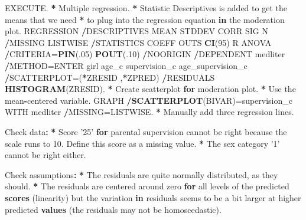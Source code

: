 \documentclass[a4paper]{book}
\newenvironment{Shaded}{\begin{snugshade}}{\end{snugshade}}
\newcommand{\KeywordTok}[1]{\textcolor[rgb]{0,0,0}{\textbf{#1}}}
\newcommand{\DecValTok}[1]{\textcolor[rgb]{0.00,0.00,0.00}{#1}}
\newcommand{\StringTok}[1]{\textcolor[rgb]{0.00,0.00,0.00}{#1}}
\newcommand{\ControlFlowTok}[1]{\textcolor[rgb]{0.00,0.00,0.00}{\textbf{#1}}}
\newcommand{\OperatorTok}[1]{\textcolor[rgb]{0.00,0.00,0.00}{\textbf{#1}}}
\newcommand{\ErrorTok}[1]{\textcolor[rgb]{0.00,0.00,0.00}{\textbf{#1}}}
\newcommand{\NormalTok}[1]{#1}
\theoremstyle{definition}
\theoremstyle{definition}
\theoremstyle{definition}
\theoremstyle{remark}
\begin{document}
\begin{Shaded}
\begin{Highlighting}[]
\NormalTok{EXECUTE.  }
\OperatorTok{*}\StringTok{ }\NormalTok{Multiple regression.  }
\OperatorTok{*}\StringTok{ }\NormalTok{Statistic Descriptives is added to get the means that we need  }
\OperatorTok{*}\StringTok{ }\NormalTok{to plug into the regression equation }\ControlFlowTok{in}\NormalTok{ the moderation plot.  }
\NormalTok{REGRESSION  }
  \OperatorTok{/}\NormalTok{DESCRIPTIVES MEAN STDDEV CORR SIG N  }
  \OperatorTok{/}\NormalTok{MISSING LISTWISE  }
  \OperatorTok{/}\NormalTok{STATISTICS COEFF OUTS }\KeywordTok{CI}\NormalTok{(}\DecValTok{95}\NormalTok{) R ANOVA  }
  \OperatorTok{/}\NormalTok{CRITERIA=}\KeywordTok{PIN}\NormalTok{(.}\DecValTok{05}\NormalTok{) }\KeywordTok{POUT}\NormalTok{(.}\DecValTok{10}\NormalTok{)  }
  \OperatorTok{/}\NormalTok{NOORIGIN   }
  \OperatorTok{/}\NormalTok{DEPENDENT medliter  }
  \OperatorTok{/}\NormalTok{METHOD=ENTER girl age_c supervision_c age_supervision_c  }
  \OperatorTok{/}\NormalTok{SCATTERPLOT=(}\OperatorTok{*}\NormalTok{ZRESID ,}\OperatorTok{*}\NormalTok{ZPRED)  }
  \OperatorTok{/}\NormalTok{RESIDUALS }\KeywordTok{HISTOGRAM}\NormalTok{(ZRESID).  }
\OperatorTok{*}\StringTok{ }\NormalTok{Create scatterplot }\ControlFlowTok{for}\NormalTok{ moderation plot.  }
\OperatorTok{*}\StringTok{ }\NormalTok{Use the mean}\OperatorTok{-}\NormalTok{centered variable.  }
\NormalTok{GRAPH  }
  \OperatorTok{/}\KeywordTok{SCATTERPLOT}\NormalTok{(BIVAR)=supervision_c WITH medliter  }
  \OperatorTok{/}\NormalTok{MISSING=LISTWISE.  }
\OperatorTok{*}\StringTok{ }\NormalTok{Manually add three regression lines.  }
    
\NormalTok{Check data}\OperatorTok{:}\StringTok{  }
\StringTok{  }
\ErrorTok{*}\StringTok{ }\NormalTok{Score }\StringTok{'25'} \ControlFlowTok{for}\NormalTok{ parental supervision cannot be right because the scale runs}
\NormalTok{to }\DecValTok{10}\NormalTok{. Define this score as a missing value.}
\OperatorTok{*}\StringTok{ }\NormalTok{The sex category }\StringTok{'1'}\NormalTok{ cannot be right either.  }
  
\NormalTok{Check assumptions}\OperatorTok{:}\StringTok{  }
\StringTok{  }
\ErrorTok{*}\StringTok{ }\NormalTok{The residuals are quite normally distributed, as they should.  }
\OperatorTok{*}\StringTok{ }\NormalTok{The residuals are centered around zero }\ControlFlowTok{for}\NormalTok{ all levels of the predicted}
\KeywordTok{scores}\NormalTok{ (linearity) but the variation }\ControlFlowTok{in}\NormalTok{ residuals seems to be a bit larger at}
\NormalTok{higher predicted }\KeywordTok{values}\NormalTok{ (the residuals may not be homoscedastic).}
  

\end{Highlighting}
\end{Shaded}
\end{document}
